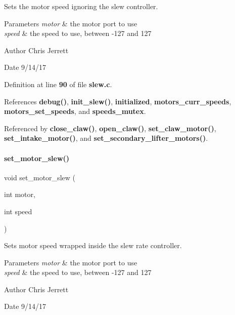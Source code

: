 Sets the motor speed ignoring the slew controller. 


\begin{DoxyParams}{Parameters}
{\em motor} & the motor port to use \\
\hline
{\em speed} & the speed to use, between -\/127 and 127 \\
\hline
\end{DoxyParams}
\begin{DoxyAuthor}{Author}
Chris Jerrett 
\end{DoxyAuthor}
\begin{DoxyDate}{Date}
9/14/17 
\end{DoxyDate}


Definition at line \textbf{ 90} of file \textbf{ slew.\+c}.



References \textbf{ debug()}, \textbf{ init\+\_\+slew()}, \textbf{ initialized}, \textbf{ motors\+\_\+curr\+\_\+speeds}, \textbf{ motors\+\_\+set\+\_\+speeds}, and \textbf{ speeds\+\_\+mutex}.



Referenced by \textbf{ close\+\_\+claw()}, \textbf{ open\+\_\+claw()}, \textbf{ set\+\_\+claw\+\_\+motor()}, \textbf{ set\+\_\+intake\+\_\+motor()}, and \textbf{ set\+\_\+secondary\+\_\+lifter\+\_\+motors()}.

\mbox{\label{slew_8h_a7dff2b79dffe55fb936d977594d7c01d}} 
\paragraph{set\+\_\+motor\+\_\+slew()}
{\footnotesize\ttfamily void set\+\_\+motor\+\_\+slew (\begin{DoxyParamCaption}\item[{int}]{motor,  }\item[{int}]{speed }\end{DoxyParamCaption})}



Sets motor speed wrapped inside the slew rate controller. 


\begin{DoxyParams}{Parameters}
{\em motor} & the motor port to use \\
\hline
{\em speed} & the speed to use, between -\/127 and 127 \\
\hline
\end{DoxyParams}
\begin{DoxyAuthor}{Author}
Chris Jerrett 
\end{DoxyAuthor}
\begin{DoxyDate}{Date}
9/14/17 
\end{DoxyDate}


